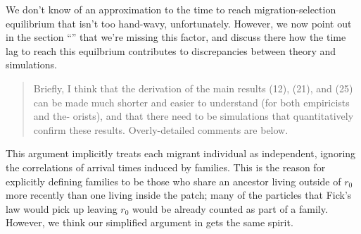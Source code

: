 \reply
We don't know of an approximation to the time to reach migration-selection equilibrium
that isn't too hand-wavy,
unfortunately. 
However, we now point out in the section ``'' that we're missing this factor,
and discuss there how the time lag to reach this equilbrium contributes to discrepancies between theory and simulations.



\reviewersection

\begin{quote}
Briefly, I think that the derivation of the main results (12), (21), and (25) can
be made much shorter and easier to understand (for both empiricists and the-
orists), and that there need to be simulations that quantitatively confirm these
results. Overly-detailed comments are below.
\end{quote}


\reply
This argument implicitly treats each migrant individual as independent,
ignoring the correlations of arrival times induced by families.
This is the reason for explicitly defining families to be those who share an ancestor living outside of $r_0$
more recently than one living inside the patch;
many of the particles that Fick's law would pick up leaving $r_0$ would be already counted as part of a family.
However, we think our simplified argument in  gets the same spirit.


